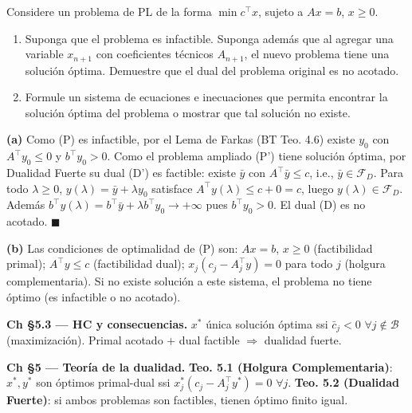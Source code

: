 \documentclass[12pt]{article}
\theoremstyle{plain}
\begin{document}
Considere un problema de PL de la forma $\min c^{\top}x$, sujeto a $Ax = b$, $x \geq 0$.

\begin{enumerate}[label=\alph*)]
      \item Suponga que el problema es infactible. Suponga además que al agregar una
            variable $x_{n+1}$ con coeficientes técnicos $A_{n+1}$, el nuevo problema tiene una
            solución óptima. Demuestre que el dual del problema original es no acotado.

      \item Formule un sistema de ecuaciones e inecuaciones que permita encontrar la
            solución óptima del problema o mostrar que tal solución no existe.
\end{enumerate}

\begin{solucion}

\noindent\textbf{(a)} Como (P) es infactible, por el Lema de Farkas (BT Teo. 4.6) existe $y_0$ con $A^\top y_0\leq 0$ y $b^\top y_0>0$. Como el problema ampliado (P') tiene solución óptima, por Dualidad Fuerte su dual (D') es factible: existe $\bar{y}$ con $A^\top\bar{y}\leq c$, i.e., $\bar{y}\in\mathcal{F}_D$. Para todo $\lambda\geq 0$, $y(\lambda)=\bar{y}+\lambda y_0$ satisface $A^\top y(\lambda)\leq c+0=c$, luego $y(\lambda)\in\mathcal{F}_D$. Además $b^\top y(\lambda)=b^\top\bar{y}+\lambda b^\top y_0\to+\infty$ pues $b^\top y_0>0$. El dual (D) es no acotado. $\blacksquare$

\noindent\textbf{(b)} Las condiciones de optimalidad de (P) son: $Ax=b$, $x\geq 0$ (factibilidad primal); $A^\top y\leq c$ (factibilidad dual); $x_j(c_j-A_j^\top y)=0$ para todo $j$ (holgura complementaria). Si no existe solución a este sistema, el problema no tiene óptimo (es infactible o no acotado).

\end{solucion}

\begin{teofund}
\textbf{Ch §5.3 — HC y consecuencias.} $x^*$ única solución óptima ssi $\bar{c}_j<0$ $\forall j\notin\mathcal{B}$ (maximización). Primal acotado $+$ dual factible $\Rightarrow$ dualidad fuerte.

\textbf{Ch §5 — Teoría de la dualidad.} \textbf{Teo. 5.1 (Holgura Complementaria)}: $x^*,y^*$ son óptimos primal-dual ssi $x^*_j(c_j-A_j^\top y^*)=0$ $\forall j$. \textbf{Teo. 5.2 (Dualidad Fuerte)}: si ambos problemas son factibles, tienen óptimo finito igual.
\end{teofund}
\end{document}
